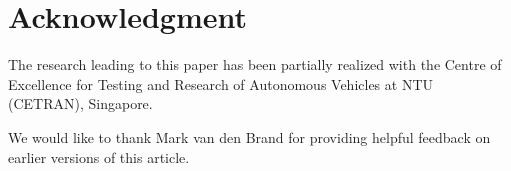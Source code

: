 \section*{Acknowledgment}

The research leading to this paper has been partially realized with the Centre of Excellence for Testing and Research of Autonomous Vehicles at NTU (CETRAN), Singapore. 

We would like to thank Mark van den Brand for providing helpful feedback on earlier versions of this article.
